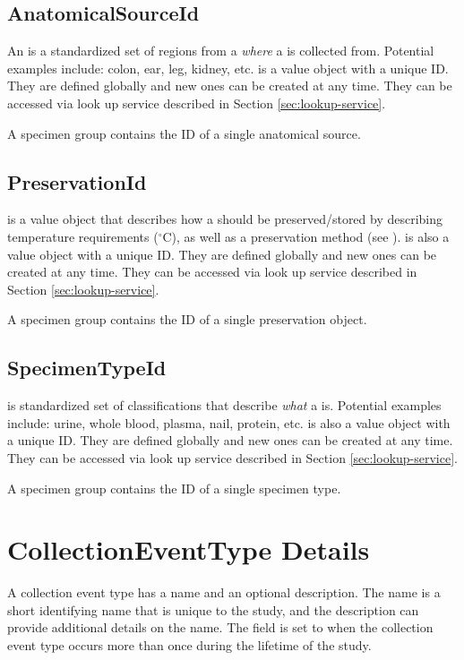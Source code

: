 \subsection*{AnatomicalSourceId}

An  is a standardized set of regions from a
 \emph{where} a  is collected
from. Potential examples include: colon, ear, leg, kidney,
etc.  is a value object with a unique ID. They are
defined globally and new ones can be created at any time. They can be accessed
via look up service described in Section \ref{sec:lookup-service}.

A specimen group contains the ID of a single anatomical source.

\subsection*{PreservationId}

 is a value object that describes how a
 should be preserved/stored by describing temperature
requirements ($^\circ$C), as well as a preservation method (see
).  is also a value
object with a unique ID. They are defined globally and new ones can be created
at any time. They can be accessed via look up service described in Section
\ref{sec:lookup-service}.

A specimen group contains the ID of a single preservation object.

\subsection*{SpecimenTypeId}

 is standardized set of classifications that describe
\emph{what} a  is. Potential examples include: urine,
whole blood, plasma, nail, protein, etc.  is also a
value object with a unique ID. They are defined globally and new ones can be
created at any time. They can be accessed via look up service described in
Section \ref{sec:lookup-service}.

A specimen group contains the ID of a single specimen type.

\section{CollectionEventType Details}
\label{sec:collection-event-type}
A collection event type has a name and an optional description. The name is a
short identifying name that is unique to the study, and the description can
provide additional details on the name. The  field is set to
 when the collection event type occurs more than once during the
lifetime of the study.

